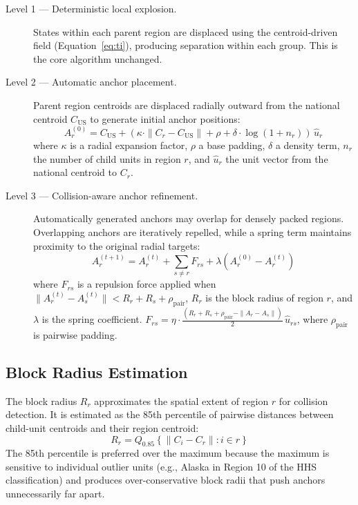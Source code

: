 \documentclass[12pt, a4paper]{article}
\numberwithin{equation}{section}
\begin{document}
\begin{description}
  \item[Level 1 — Deterministic local explosion.] States within each parent region are displaced using the centroid-driven field (Equation~\eqref{eq:ti}), producing separation within each group. This is the core algorithm unchanged.
  \item[Level 2 — Automatic anchor placement.] Parent region centroids are displaced radially outward from the national centroid $C_{\text{US}}$ to generate initial anchor positions:
  \[
    A_r^{(0)} = C_{\text{US}} + \left(\kappa \cdot \|C_r - C_{\text{US}}\| + \rho + \delta \cdot \log(1 + n_r)\right)\,\hat{u}_r
  \]
  where $\kappa$ is a radial expansion factor, $\rho$ a base padding, $\delta$ a density term, $n_r$ the number of child units in region $r$, and $\hat{u}_r$ the unit vector from the national centroid to $C_r$.
  \item[Level 3 — Collision-aware anchor refinement.] Automatically generated anchors may overlap for densely packed regions. Overlapping anchors are iteratively repelled, while a spring term maintains proximity to the original radial targets:
  \begin{equation}
    A_r^{(t+1)} = A_r^{(t)} + \sum_{s \neq r} F_{rs} + \lambda\left(A_r^{(0)} - A_r^{(t)}\right)
    \label{eq:anchor_update}
  \end{equation}
  where $F_{rs}$ is a repulsion force applied when $\|A_r^{(t)} - A_s^{(t)}\| < R_r + R_s + \rho_{\text{pair}}$, $R_r$ is the block radius of region $r$, and $\lambda$ is the spring coefficient. $F_{rs} = \eta \cdot \frac{(R_r + R_s + \rho_{\text{pair}} - \|A_r - A_s\|)}{2}\,\hat{u}_{rs}$, where $\rho_{\text{pair}}$ is pairwise padding.
\end{description}

\subsection{Block Radius Estimation}

The block radius $R_r$ approximates the spatial extent of region $r$ for collision detection. It is estimated as the 85th percentile of pairwise distances between child-unit centroids and their region centroid:
\[
  R_r = Q_{0.85}\left\{\|C_i - C_r\| : i \in r\right\}
\]
The 85th percentile is preferred over the maximum because the maximum is sensitive to individual outlier units (e.g., Alaska in Region 10 of the HHS classification) and produces over-conservative block radii that push anchors unnecessarily far apart.
\end{document}
